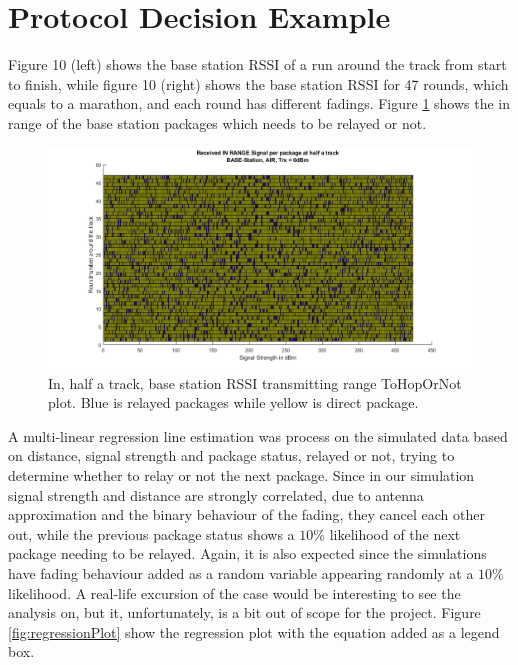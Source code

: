 \section{Protocol Decision Example}\label{sc:protocolDecisionExample}
Figure 10 (left) shows the base station RSSI of a run around the track from start to finish, while figure 10 (right) shows the base station RSSI for 47 rounds, which equals to a marathon, and each round has different fadings. Figure \ref{fig:recievedSignal_inRange_halfTrack} shows the in range of the base station packages which needs to be relayed or not.


\begin{figure}[H]
	\centering
	\includegraphics[width=\linewidth]{theory/protocolDecisionExample/fig/recievedSignal_inRange_halfTrack.png}
	\caption{In, half a track, base station RSSI transmitting range ToHopOrNot plot. Blue is relayed packages while yellow is direct package.}
	\label{fig:recievedSignal_inRange_halfTrack}
\end{figure}

A multi-linear regression line estimation was process on the simulated data based on distance, signal strength and package status, relayed or not, trying to determine whether to relay or not the next package. Since in our simulation signal strength and distance are strongly correlated, due to antenna approximation and the binary behaviour of the fading, they cancel each other out, while the previous package status shows a $10\%$ likelihood of the next package needing to be relayed. Again, it is also expected since the simulations have fading behaviour added as a random variable appearing randomly at a $10\%$ likelihood. A real-life excursion of the case would be interesting to see the analysis on, but it, unfortunately, is a bit out of scope for the project. Figure \ref{fig:regressionPlot} show the regression plot with the equation added as a legend box.

